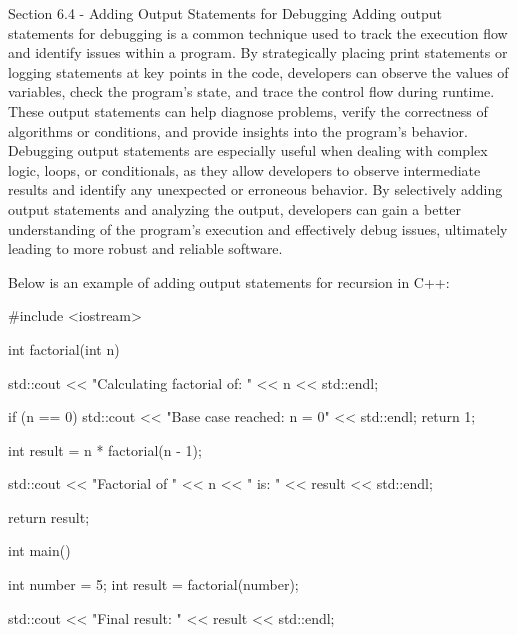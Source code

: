 \begin{notes}{Section 6.4 - Adding Output Statements for Debugging}
    Adding output statements for debugging is a common technique used to track the execution flow and identify issues within a program. By strategically placing print statements or logging statements at key points in the code, developers can observe the values of variables, check the program's state, and trace 
    the control flow during runtime. These output statements can help diagnose problems, verify the correctness of algorithms or conditions, and provide insights into the program's behavior. Debugging output statements are especially useful when dealing with complex logic, loops, or conditionals, as they allow 
    developers to observe intermediate results and identify any unexpected or erroneous behavior. By selectively adding output statements and analyzing the output, developers can gain a better understanding of the program's execution and effectively debug issues, ultimately leading to more robust and reliable software.
    
    \begin{highlight}
        Below is an example of adding output statements for recursion in C++:
    
    \begin{code}[C++]
    #include <iostream>

    int factorial(int n) {
        std::cout << "Calculating factorial of: " << n << std::endl;
    
        if (n == 0) {
            std::cout << "Base case reached: n = 0" << std::endl;
            return 1;
        }
    
        int result = n * factorial(n - 1);
    
        std::cout << "Factorial of " << n << " is: " << result << std::endl;
    
        return result;
    }
    
    int main() {
        int number = 5;
        int result = factorial(number);
    
        std::cout << "Final result: " << result << std::endl;
    
}
\end{code}
\end{highlight}
\end{notes}
